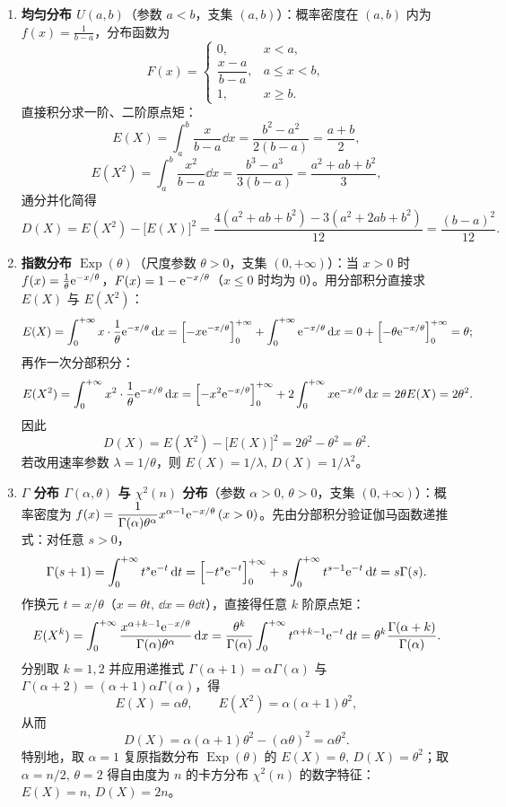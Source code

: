 \begin{enumerate}
  \item \textbf{均匀分布 $U(a,b)$}（参数 $a<b$，支集 $(a,b)$）：概率密度在 $(a,b)$ 内为 $f(x)=\frac{1}{b-a}$，分布函数为
  \[
    F(x)=
    \begin{cases}
      0,& x<a,\\
      \dfrac{x-a}{b-a},& a\le x<b,\\
      1,& x\ge b.
    \end{cases}
  \]
  直接积分求一阶、二阶原点矩：
  \[
    E(X)=\int_{a}^{b}\frac{x}{b-a}\dd x
    =\frac{b^2-a^2}{2(b-a)}=\frac{a+b}{2},
  \]
  \[
    E(X^2)=\int_{a}^{b}\frac{x^2}{b-a}\dd x
    =\frac{b^3-a^3}{3(b-a)}=\frac{a^2+ab+b^2}{3},
  \]
  通分并化简得
  \[
    D(X)=E(X^2)-\bigl[E(X)\bigr]^2
    =\frac{4(a^2+ab+b^2)-3(a^2+2ab+b^2)}{12}
    =\frac{(b-a)^2}{12}.
  \]

  \item \textbf{指数分布 $\operatorname{Exp}(\theta)$}（尺度参数 $\theta>0$，支集 $(0,+\infty)$）：当 $x>0$ 时 $f(x)=\frac{1}{\theta}\mathrm{e}^{-x/\theta}$，$F(x)=1-\mathrm{e}^{-x/\theta}$（$x\le 0$ 时均为 $0$）。用分部积分直接求 $E(X)$ 与 $E(X^2)$：
  \[
    E(X)=\int_{0}^{+\infty}x\cdot\frac{1}{\theta}\mathrm{e}^{-x/\theta}\mathop{}\!\mathrm{d} x
    =\Bigl[-x\mathrm{e}^{-x/\theta}\Bigr]_{0}^{+\infty}+\int_{0}^{+\infty}\mathrm{e}^{-x/\theta}\mathop{}\!\mathrm{d} x
    =0+\Bigl[-\theta\mathrm{e}^{-x/\theta}\Bigr]_{0}^{+\infty}=\theta;
  \]
  再作一次分部积分：
  \[
    E(X^2)=\int_{0}^{+\infty}x^2\cdot\frac{1}{\theta}\mathrm{e}^{-x/\theta}\mathop{}\!\mathrm{d} x
    =\Bigl[-x^2\mathrm{e}^{-x/\theta}\Bigr]_{0}^{+\infty}+2\int_{0}^{+\infty}x\mathrm{e}^{-x/\theta}\mathop{}\!\mathrm{d} x
    =2\theta E(X)=2\theta^2.
  \]
  因此
  \[
    D(X)=E(X^2)-\bigl[E(X)\bigr]^2=2\theta^2-\theta^2=\theta^2.
  \]
  若改用速率参数 $\lambda=1/\theta$，则 $E(X)=1/\lambda,\,D(X)=1/\lambda^2$。

  \item \textbf{$\Gamma$ 分布 $\Gamma(\alpha,\theta)$ 与 $\chi^2(n)$ 分布}（参数 $\alpha>0,\,\theta>0$，支集 $(0,+\infty)$）：概率密度为 $f(x)=\dfrac{1}{\Gamma(\alpha)\theta^\alpha}x^{\alpha-1}\mathrm{e}^{-x/\theta}\,(x>0)$。先由分部积分验证伽马函数递推式：对任意 $s>0$，
  \[
    \Gamma(s+1)=\int_{0}^{+\infty}t^s\mathrm{e}^{-t}\mathop{}\!\mathrm{d} t
    =\Bigl[-t^s\mathrm{e}^{-t}\Bigr]_{0}^{+\infty}+s\int_{0}^{+\infty}t^{s-1}\mathrm{e}^{-t}\mathop{}\!\mathrm{d} t
    =s\Gamma(s).
  \]
  作换元 $t=x/\theta$（$x=\theta t,\,\dd x=\theta\dd t$），直接得任意 $k$ 阶原点矩：
  \[
    E(X^k)=\int_{0}^{+\infty}\frac{x^{\alpha+k-1}\mathrm{e}^{-x/\theta}}{\Gamma(\alpha)\theta^\alpha}\mathop{}\!\mathrm{d} x
    =\frac{\theta^k}{\Gamma(\alpha)}\int_{0}^{+\infty}t^{\alpha+k-1}\mathrm{e}^{-t}\mathop{}\!\mathrm{d} t
    =\theta^k\frac{\Gamma(\alpha+k)}{\Gamma(\alpha)}.
  \]
  分别取 $k=1,2$ 并应用递推式 $\Gamma(\alpha+1)=\alpha\Gamma(\alpha)$ 与 $\Gamma(\alpha+2)=(\alpha+1)\alpha\Gamma(\alpha)$，得
  \[
    E(X)=\alpha\theta,\qquad E(X^2)=\alpha(\alpha+1)\theta^2,
  \]
  从而
  \[
    D(X)=\alpha(\alpha+1)\theta^2-(\alpha\theta)^2=\alpha\theta^2.
  \]
  特别地，取 $\alpha=1$ 复原指数分布 $\operatorname{Exp}(\theta)$ 的 $E(X)=\theta,\,D(X)=\theta^2$；取 $\alpha=n/2,\,\theta=2$ 得自由度为 $n$ 的卡方分布 $\chi^2(n)$ 的数字特征：$E(X)=n,\,D(X)=2n$。


\end{enumerate}
